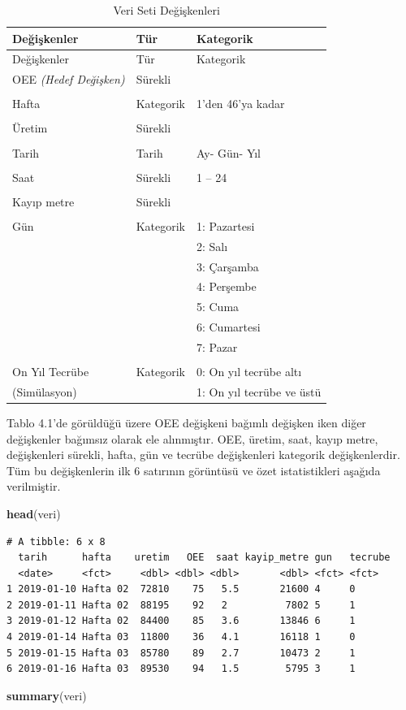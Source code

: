 \documentclass[12pt,twoside]{deuthesis}
\newenvironment{Shaded}{\begin{snugshade}}{\end{snugshade}}
\newcommand{\KeywordTok}[1]{\textcolor[rgb]{0.13,0.29,0.53}{\textbf{#1}}}
\newcommand{\NormalTok}[1]{#1}
\begin{document}
\begin{longtable}[]{@{}lll@{}}
\caption{\label{tab:inher} Veri Seti Değişkenleri}\tabularnewline
\toprule
Değişkenler & Tür & Kategorik\tabularnewline
\midrule
\endfirsthead
\toprule
Değişkenler & Tür & Kategorik\tabularnewline
\midrule
\endhead
OEE \emph{(Hedef Değişken)} & Sürekli &\tabularnewline
& &\tabularnewline
Hafta & Kategorik & 1'den 46'ya kadar\tabularnewline
& &\tabularnewline
Üretim & Sürekli &\tabularnewline
& &\tabularnewline
Tarih & Tarih & Ay- Gün- Yıl\tabularnewline
& &\tabularnewline
Saat & Sürekli & 1 -- 24\tabularnewline
& &\tabularnewline
Kayıp metre & Sürekli &\tabularnewline
& &\tabularnewline
Gün & Kategorik & 1: Pazartesi\tabularnewline
& & 2: Salı\tabularnewline
& & 3: Çarşamba\tabularnewline
& & 4: Perşembe\tabularnewline
& & 5: Cuma\tabularnewline
& & 6: Cumartesi\tabularnewline
& & 7: Pazar\tabularnewline
& &\tabularnewline
On Yıl Tecrübe & Kategorik & 0: On yıl tecrübe altı\tabularnewline
(Simülasyon) & & 1: On yıl tecrübe ve üstü\tabularnewline
\bottomrule
\end{longtable}
Tablo 4.1'de görüldüğü üzere OEE değişkeni bağımlı değişken iken diğer değişkenler bağımsız olarak ele alınmıştır. OEE, üretim, saat, kayıp metre, değişkenleri sürekli, hafta, gün ve tecrübe değişkenleri kategorik değişkenlerdir. Tüm bu değişkenlerin ilk 6 satırının görüntüsü ve özet istatistikleri aşağıda verilmiştir.
\begin{Shaded}
\begin{Highlighting}[]
\KeywordTok{head}\NormalTok{(veri)}
\end{Highlighting}
\end{Shaded}
\begin{verbatim}
# A tibble: 6 x 8
  tarih      hafta    uretim   OEE  saat kayip_metre gun   tecrube
  <date>     <fct>     <dbl> <dbl> <dbl>       <dbl> <fct> <fct>  
1 2019-01-10 Hafta 02  72810    75   5.5       21600 4     0      
2 2019-01-11 Hafta 02  88195    92   2          7802 5     1      
3 2019-01-12 Hafta 02  84400    85   3.6       13846 6     1      
4 2019-01-14 Hafta 03  11800    36   4.1       16118 1     0      
5 2019-01-15 Hafta 03  85780    89   2.7       10473 2     1      
6 2019-01-16 Hafta 03  89530    94   1.5        5795 3     1      
\end{verbatim}
\begin{Shaded}
\begin{Highlighting}[]
\KeywordTok{summary}\NormalTok{(veri)}
\end{Highlighting}
\end{Shaded}
\end{document}
